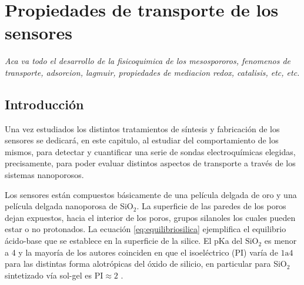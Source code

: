  \newcommand{\NoBiblioEQ}[1]{
 \ifthenelse{\equal{#1}{verdadero}}{}{}
 \NoBiblioEQ{verdadero}}


 \FormatoCapituloDosLineas
 
 \chapter{Propiedades de transporte de los sensores}
 \label{chap:Electroquimica}

 \thispagestyle{empty}
	
 \noindent\textit{Aca va todo el desarrollo de la fisicoquimica de los mesospororos, fenomenos de  transporte, adsorcion, lagmuir, propiedades de mediacion redox, catalisis, etc, etc.}

 \vfill
 \minitoc
 \newpage

\section{Introducción}

	Una vez estudiados los distintos tratamientos de síntesis y fabricación de los sensores se dedicará, en este capitulo, al estudiar del comportamiento de los mismos, para detectar y cuantificar una serie de sondas electroquímicas elegidas, precisamente, para poder evaluar distintos aspectos de transporte a través de los sistemas nanoporosos. 

	Los sensores están compuestos básicamente de una película delgada de oro y una película delgada nanoporosa de SiO$_2$. La superficie de las paredes de los poros dejan expuestos, hacia el interior de los poros, grupos silanoles los cuales pueden estar o no protonados.\cite{Brinker1990,Soler-Illia2011} La ecuación \ref{eq:equilibriosilica} ejemplifica el equilibrio ácido-base que se establece en la superficie de la silice. El pKa del $\text{SiO}_2$ es menor a 4 y la mayoría de los autores coinciden en que el isoeléctrico (PI) varía de $1 \text{a} 4$ para las distintas forma alotrópicas del óxido de silicio, en particular para SiO$_2$ sintetizado vía sol-gel es $\text{PI}\approx 2$ \cite{Kosmulski2002,Kosmulski2014,Schwarz1984}.

